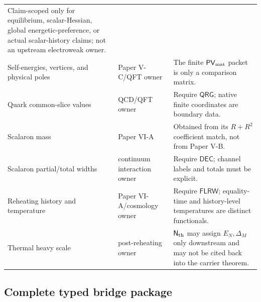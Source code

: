 \documentclass[12pt,a4paper]{article}
\begin{document}
\begin{table}[H]
\begin{tabularx}{\textwidth}{@{}L{0.27\textwidth}L{0.22\textwidth}Y@{}}
Claim-scoped only for equilibrium, scalar-Hessian, global energetic-preference, or actual scalar-history claims; not an upstream electroweak owner.\\
Self-energies, vertices, and physical poles & Paper V-C/QFT owner &
The finite \(\mathsf{PV}_{\rm mat}\) packet is only a comparison matrix.\\
Quark common-slice values & QCD/QFT owner &
Require \(\mathsf{QRG}\); native finite coordinates are boundary data.\\
Scalaron mass & Paper VI-A &
Obtained from its \(R+R^2\) coefficient match, not from Paper V-B.\\
Scalaron partial/total widths & continuum interaction owner &
Require \(\mathsf{DEC}\); channel labels and totals must be explicit.\\
Reheating history and temperature & Paper VI-A/cosmology owner &
Require \(\mathsf{FLRW}\); equality-time and history-level temperatures are
distinct functionals.\\
Thermal heavy scale & post-reheating owner &
\(\mathsf N_{\rm th}\) may assign \(E_N,\Delta_M\) only downstream and may
not be cited back into the carrier theorem.\\
\bottomrule
\end{tabularx}
\end{table}

\subsection{Complete typed bridge package}
\label{p6:sec:complete-bridge}
\end{document}
